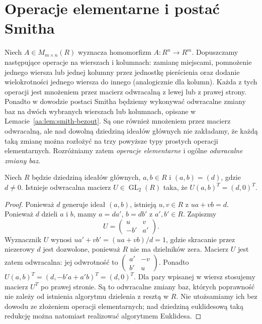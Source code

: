 \section{Operacje elementarne i postać Smitha}
\begin{definicja}
\label{aa:def:smith-operations}
Niech $A\in M_{m\times n}(R)$ wyznacza homomorfizm
$A:R^n\to R^m$. Dopuszczamy następujące operacje na wierszach
i kolumnach: zamianę miejscami, pomnożenie jednego wiersza lub
jednej kolumny przez jednostkę pierścienia oraz dodanie wielokrotności
jednego wiersza do innego (analogicznie dla kolumn).
Każda z tych operacji jest mnożeniem przez macierz odwracalną
z lewej lub z prawej strony. Ponadto w dowodzie postaci Smitha
będziemy wykonywać odwracalne zmiany baz na dwóch wybranych
wierszach lub kolumnach, opisane w
Lemacie~\ref{aa:lem:smith-bezout}. Są one również
mnożeniem przez macierz odwracalną, ale nad dowolną
dziedziną ideałów głównych nie zakładamy, że każdą taką
zmianę można rozłożyć na trzy powyższe typy prostych
operacji elementarnych. Rozróżniamy zatem
\emph{operacje elementarne} i ogólne \emph{odwracalne
zmiany baz}.
\end{definicja}

\begin{lemat}
\label{aa:lem:smith-bezout}
Niech $R$ będzie dziedziną ideałów głównych, $a,b\in R$
i $(a,b)=(d)$, gdzie $d\ne0$.
Istnieje odwracalna macierz $U\in\operatorname{GL}_2(R)$ taka, że
$U(a,b)^T=(d,0)^T$.
\end{lemat}
\begin{proof}
Ponieważ $d$ generuje ideał $(a,b)$, istnieją $u,v\in R$
z $ua+vb=d$. Ponieważ $d$ dzieli $a$ i $b$, mamy $a=da'$,
$b=db'$ z $a',b'\in R$. Zapiszmy
\[
U=\begin{pmatrix}u&v\\-b'&a'\end{pmatrix}.
\]
Wyznacznik $U$ wynosi $ua'+vb'=(ua+vb)/d=1$, gdzie
skracanie przez niezerowy $d$ jest dozwolone, ponieważ $R$ nie
ma dzielników zera. Macierz $U$ jest zatem odwracalna: jej odwrotność to
$\begin{pmatrix}a'&-v\\b'&u\end{pmatrix}$.
Ponadto $U(a,b)^T=(d,-b'a+a'b)^T=(d,0)^T$.
Dla pary wpisanej w wiersz stosujemy macierz $U^T$ po prawej
stronie. Są to odwracalne zmiany baz, których poprawność
nie zależy od istnienia algorytmu dzielenia z resztą w $R$.
Nie utożsamiamy ich bez dowodu ze złożeniem operacji
elementarnych; nad dziedziną euklidesową taką redukcję
można natomiast realizować algorytmem Euklidesa.
\end{proof}

